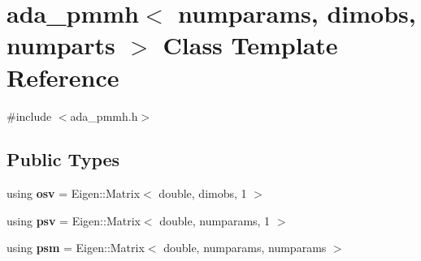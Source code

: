 \hypertarget{classada__pmmh}{}\section{ada\+\_\+pmmh$<$ numparams, dimobs, numparts $>$ Class Template Reference}
\label{classada__pmmh}


{\ttfamily \#include $<$ada\+\_\+pmmh.\+h$>$}

\subsection*{Public Types}
\begin{DoxyCompactItemize}
\item 
\mbox{\label{classada__pmmh_ad6cc974f0e1946b055e476893045c5e0}} 
using {\bfseries osv} = Eigen\+::\+Matrix$<$ double, dimobs, 1 $>$
\item 
\mbox{\label{classada__pmmh_a24849179e51b6cb08b39124b516d7268}} 
using {\bfseries psv} = Eigen\+::\+Matrix$<$ double, numparams, 1 $>$
\item 
\mbox{\label{classada__pmmh_acaa46542b8ebe093c93be5e086940b40}} 
using {\bfseries psm} = Eigen\+::\+Matrix$<$ double, numparams, numparams $>$
\end{DoxyCompactItemize}
